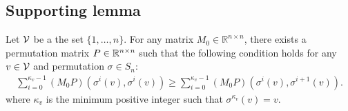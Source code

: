 \subsection{Supporting lemma}

\begin{lemma}\label{lem:diagonal-dom}
    Let $\mathcal{V}$ be a the set $\{1,\dots,n\}$. For any matrix $M_0 \in \mathbb{R}^{n\times n}$, there exists a permutation matrix $P \in \mathbb{R}^{n \times n}$ such that the following condition holds for any $v \in \mathcal{V}$ and permutation $\sigma \in S_n$:
    \begin{align}\label{eq:diagdom}
        \sum_{i=0}^{\kappa_v-1} (M_0P)(\sigma^i(v),\sigma^i(v)) \geq \sum_{i=0}^{\kappa_v-1} (M_0P)(\sigma^i(v),\sigma^{i+1}(v)).
    \end{align}
    where $\kappa_v$ is the minimum positive integer such that $\sigma^{\kappa_v}(v) = v$. 
\end{lemma}


